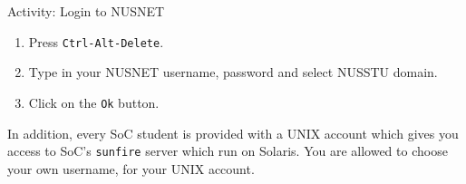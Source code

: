 \documentclass[a4paper]{beamer}
\begin{document}
\begin{frame}{Activity: Login to NUSNET}
\begin{enumerate}
\item Press \texttt{Ctrl-Alt-Delete}.
\item Type in your NUSNET username, password and select NUSSTU domain.  
\item Click on the \texttt{Ok} button.  
\end{enumerate}
\end{frame}

In addition, every SoC student is provided with a UNIX account which gives you
access to SoC's \texttt{sunfire} server which run on Solaris. You are allowed to
choose your own username, for your UNIX account.  
\end{document}
